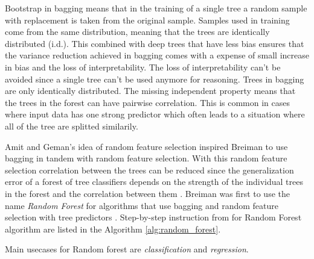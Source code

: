 Bootstrap in bagging means that in the training of a single tree a random sample with replacement is taken from the original sample. Samples used in training come from the same distribution, meaning that the trees are identically distributed (i.d.). This combined with deep trees that have less bias ensures that the variance reduction achieved in bagging comes with a expense of small increase in bias and the loss of interpretability. The loss of interpretability can't be avoided since a single tree can't be used anymore for reasoning. Trees in bagging are only identically distributed. The missing independent property means that the trees in the forest can have pairwise correlation. This is common in cases where input data has one strong predictor which often leads to a situation where all of the tree are splitted similarily. \cite{friedman2001elements}

Amit and Geman's \cite{amit1997shape} idea of random feature selection inspired Breiman to use bagging in tandem with random feature selection. With this random feature selection correlation between the trees can be reduced since the generalization error of a forest of tree classifiers depends on the strength of the individual trees in the forest and the correlation between them \cite{breiman2001random}. Breiman was first to use the name \textit{Random Forest} for algorithms that use bagging and random feature selection with tree predictors \cite{breiman2001random}. Step-by-step instruction from \cite{friedman2001elements} for Random Forest algorithm are listed in the Algorithm \ref{alg:random_forest}.

Main usecases for Random forest are \textit{classification} and \textit{regression}.

